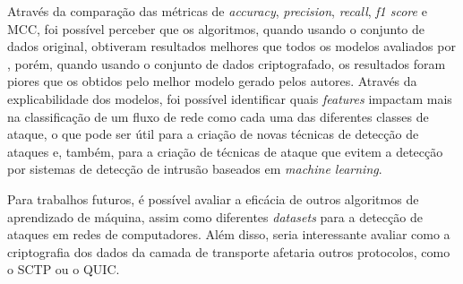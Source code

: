 \documentclass[12pt]{article}
\begin{document}
Através da comparação das métricas de \emph{accuracy}, \emph{precision}, \emph{recall}, \emph{f1 score} e MCC, foi possível perceber que os algoritmos, quando usando o conjunto de dados original, obtiveram resultados melhores que todos os modelos avaliados por \cite{rosay2021cic}, porém, quando usando o conjunto de dados criptografado, os resultados foram piores que os obtidos pelo melhor modelo gerado pelos autores. Através da explicabilidade dos modelos, foi possível identificar quais \emph{features} impactam mais na classificação de um fluxo de rede como cada uma das diferentes classes de ataque, o que pode ser útil para a criação de novas técnicas de detecção de ataques e, também, para a criação de técnicas de ataque que evitem a detecção por sistemas de detecção de intrusão baseados em \emph{machine learning}.

Para trabalhos futuros, é possível avaliar a eficácia de outros algoritmos de aprendizado de máquina, assim como diferentes \emph{datasets} para a detecção de ataques em redes de computadores. Além disso, seria interessante avaliar como a criptografia dos dados da camada de transporte afetaria outros protocolos, como o SCTP ou o QUIC.

% 
% 



\appendix
\end{document}
